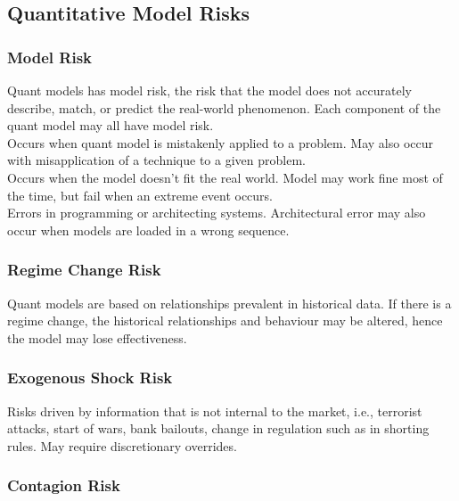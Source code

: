 \subsection{Quantitative Model Risks}

\subsubsection{Model Risk}

Quant models has model risk, the risk that the model does not accurately describe, match, or predict the real-world phenomenon. Each component of the quant model may all have model risk.\\

 Occurs when quant model is mistakenly applied to a problem. May also occur with misapplication of a technique to a given problem.\\

 Occurs when the model doesn't fit the real world. Model may work fine most of the time, but fail when an extreme event occurs.\\

 Errors in programming or architecting systems. Architectural error may also occur when models are loaded in a wrong sequence.

\subsubsection{Regime Change Risk}

Quant models are based on relationships prevalent in historical data. If there is a regime change, the historical relationships and behaviour may be altered, hence the model may lose effectiveness.

\subsubsection{Exogenous Shock Risk}

Risks driven by information that is not internal to the market, i.e., terrorist attacks, start of wars, bank bailouts, change in regulation such as in shorting rules. May require discretionary overrides.

\subsubsection{Contagion Risk}


